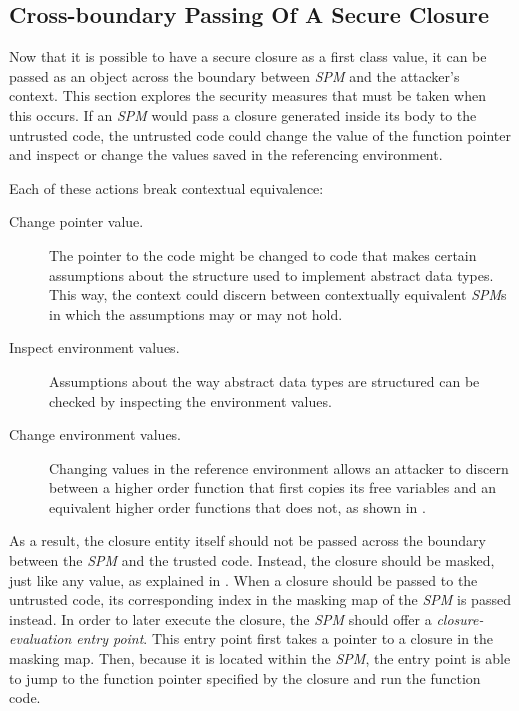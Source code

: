 \subsection{Cross-boundary Passing Of A Secure Closure }
Now that it is possible to have a secure closure as a first class value, it can be passed as an object across the boundary between \emph{SPM} and the attacker's context.
This section explores the security measures that must be taken when this occurs.
If an \emph{SPM} would pass a closure generated inside its body to the untrusted code, the untrusted code could change the value of the function pointer and inspect or change the values saved in the referencing environment.

Each of these actions break contextual equivalence:
\begin{description}
\item[Change pointer value.] The pointer to the code might be changed to code that makes certain assumptions about the structure used to implement abstract data types.
This way, the context could discern between contextually equivalent \emph{SPM}s in which the assumptions may or may not hold. 
\item[Inspect environment values.]
Assumptions about the way abstract data types are structured can be checked by inspecting the environment values.
\item[Change environment values.] Changing values in the reference environment allows an attacker to discern between a higher order function that first copies its free variables and an equivalent higher order functions that does not, as shown in .
\end{description}

As a result, the closure entity itself should not be passed across the boundary between the \emph{SPM} and the trusted code.
Instead, the closure should be masked, just like any value, as explained in . When a closure should be passed to the untrusted code, its corresponding index in the masking map of the \emph{SPM} is passed instead.
In order to later execute the closure, the \emph{SPM} should offer a \emph{closure-evaluation entry point}.
This entry point first takes a pointer to a closure in the masking map.
Then, because it is located within the \emph{SPM}, the entry point is able to jump to the function pointer specified by the closure and run the function code.

